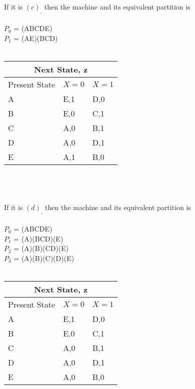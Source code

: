 \documentclass[12pt,a4paper,openany]{book}
\begin{document}
\\
\\
\\
If it is $(c)_,$ then the machine and its equivalent partition is
\\
\\
$P_0$ = (ABCDE)
\\
$P_1$ = (AE)(BCD) 
\\
\\
\begin{tabular}{ |p{3cm}|p{2cm}|p{2cm}|}
\hline
\multicolumn{3}{|c|}{Next State, z} \\
\hline
Present State  &   $X = 0$        &  $X = 1$   \\
\hline
A  &   E,1  &   D,0   \\
B  &   E,0  &   C,1    \\
C  &   A,0   &   B,1   \\
D  &   A,0  &  D,1     \\
E  &   A,1    &  B,0     \\
\hline
\end{tabular}
\\
\\
\\
If it is $(d)_,$ then the machine and its equivalent partition is
\\
\\
$P_0$ = (ABCDE)
\\
$P_1$ = (A)(BCD)(E)
\\
$P_2$ = (A)(B)(CD)(E)
\\
$P_3$ = (A)(B)(C)(D)(E)
\\
\\
\begin{tabular}{ |p{3cm}|p{2cm}|p{2cm}|}
\hline
\multicolumn{3}{|c|}{Next State, z} \\
\hline
Present State  &   $X = 0$        &  $X = 1$   \\
\hline
A  &   E,1  &   D,0   \\
B  &   E,0  &   C,1    \\
C  &   A,0   &   B,1   \\
D  &   A,0  &  D,1     \\
E  &   A,0    &  B,0     \\
\hline
\end{tabular}
\end{document}
